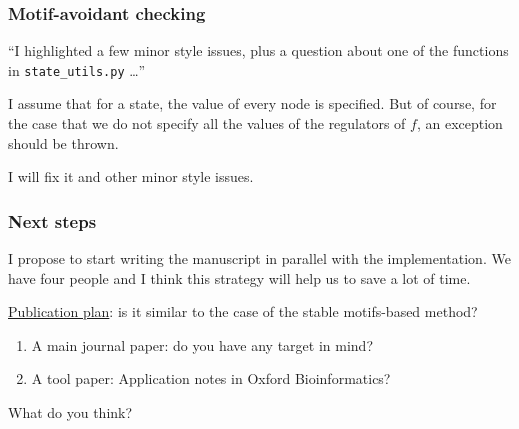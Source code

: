 \documentclass{beamer}              %
\begin{document}
\begin{frame}
\frametitle{Motif-avoidant checking}

``I highlighted a few minor style issues, plus a question about one of the functions in \texttt{state\_utils.py} \dots''

\hspace{0cm}

I assume that for a state, the value of every node is specified.
But of course, for the case that we do not specify all the values of the regulators of \(f\), an exception should be thrown.

\hspace{0cm}

I will fix it and other minor style issues.

\end{frame}

\begin{frame}
\frametitle{Next steps}

I propose to start writing the manuscript in parallel with the
implementation. 
We have four people and I think this strategy will help us to save a lot of time.

\hspace{0cm}

\underline{Publication plan}: is it similar to the case of the stable motifs-based method?
\begin{enumerate}
  \item A main journal paper: do you have any target in mind?
  \item A tool paper: Application notes in Oxford Bioinformatics?
\end{enumerate}

\hspace{0cm}

What do you think?

\end{frame}
\end{document}

